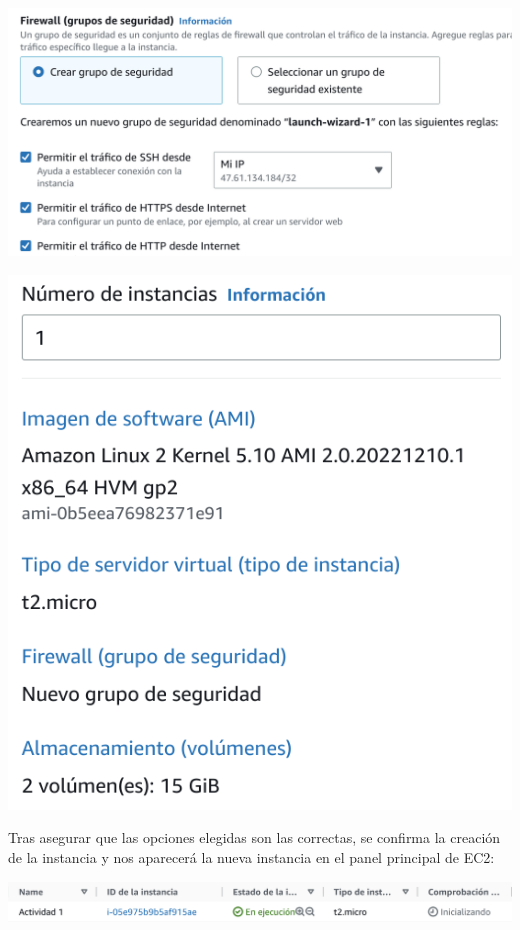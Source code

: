 \documentclass{\ClassPath/viu-tfm-template}
\begin{document}
{
\begin{minipage}{0.6\linewidth}
    \includegraphics[frame,width=\linewidth]{img/seguridad.png}
\end{minipage}
\hfill
\begin{minipage}{0.35\linewidth}
    \includegraphics[frame,width=\linewidth]{img/resumen.png}
\end{minipage}
}

Tras asegurar que las opciones elegidas son las correctas, se confirma la creación de la instancia y nos aparecerá la nueva instancia en el panel principal de EC2:

\includegraphics[frame,width=\linewidth]{img/estado.png}
\end{document}
